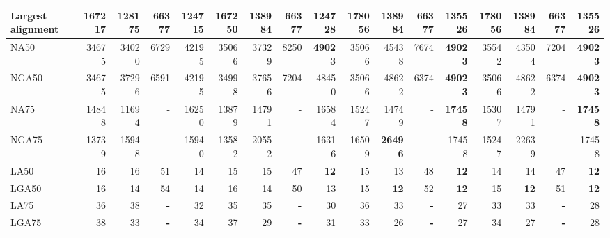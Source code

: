 \documentclass[12pt,a4paper]{article}
\begin{document}
\begin{table}[ht]
\begin{center}
\begin{tabular}{|l*{16}{|r}|}
Largest alignment & 167217 & 128175 & 66377 & 124715 & 167250 & 138984 & 66377 & 124728 & {\bf 178056} & 138984 & 66377 & 135526 & {\bf 178056} & 138984 & 66377 & 135526 \\ \hline
NA50 & 34675 & 34020 & 6729 & 42195 & 35066 & 37329 & 8250 & {\bf 49023} & 35066 & 45438 & 7674 & {\bf 49023} & 35542 & 43504 & 7204 & {\bf 49023} \\ \hline
NGA50 & 34675 & 37296 & 6591 & 42195 & 34998 & 37656 & 7204 & 48450 & 35066 & 48622 & 6374 & {\bf 49023} & 35066 & 48622 & 6374 & {\bf 49023} \\ \hline
NA75 & 14848 & 11694 & - & 16250 & 13879 & 14791 & - & 16584 & 15247 & 14749 & - & {\bf 17458} & 15307 & 14791 & - & {\bf 17458} \\ \hline
NGA75 & 13739 & 15948 & - & 15940 & 13582 & 20552 & - & 16316 & 16509 & {\bf 26496} & - & 17458 & 15247 & 22639 & - & 17458 \\ \hline
LA50 & 16 & 16 & 51 & 14 & 15 & 15 & 47 & {\bf 12} & 15 & 13 & 48 & {\bf 12} & 14 & 14 & 47 & {\bf 12} \\ \hline
LGA50 & 16 & 14 & 54 & 14 & 16 & 14 & 50 & 13 & 15 & {\bf 12} & 52 & {\bf 12} & 15 & {\bf 12} & 51 & {\bf 12} \\ \hline
LA75 & 36 & 38 & {\bf -} & 32 & 35 & 35 & {\bf -} & 30 & 36 & 33 & {\bf -} & 27 & 33 & 33 & {\bf -} & 28 \\ \hline
LGA75 & 38 & 33 & {\bf -} & 34 & 37 & 29 & {\bf -} & 31 & 33 & 26 & {\bf -} & 27 & 34 & 27 & {\bf -} & 28 \\ \hline
\end{tabular}
\end{center}
\end{table}
\end{document}
